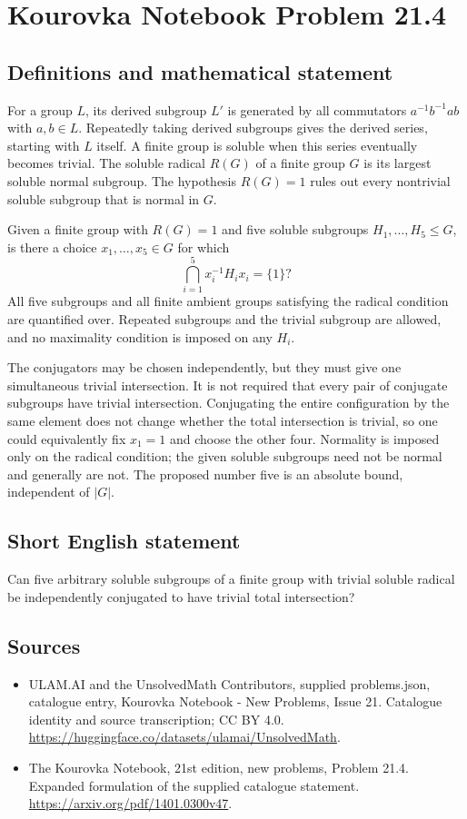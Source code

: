 \documentclass[11pt,a4paper]{article}
\begin{document}
\section*{Kourovka Notebook Problem 21.4}\label{statement}

\subsection{Definitions and mathematical statement}
For a group $L$, its derived subgroup $L'$ is generated by all
commutators $a^{-1}b^{-1}ab$ with $a,b\in L$. Repeatedly taking derived
subgroups gives the derived series, starting with $L$ itself.
A finite group is soluble when this series eventually becomes trivial.
The soluble radical $R(G)$ of a finite group $G$ is its largest soluble
normal subgroup. The hypothesis $R(G)=1$ rules out every nontrivial
soluble subgroup that is normal in $G$.

Given a finite group with $R(G)=1$ and five soluble subgroups
$H_1,\ldots,H_5\le G$, is there a choice $x_1,\ldots,x_5\in G$ for which
\[
 \bigcap_{i=1}^{5}x_i^{-1}H_i x_i=\{1\}?
\]
All five subgroups and all finite ambient groups satisfying the radical
condition are quantified over. Repeated subgroups and the trivial subgroup
are allowed, and no maximality condition is imposed on any $H_i$.

The conjugators may be chosen independently, but they must give one
simultaneous trivial intersection. It is not required that every pair
of conjugate subgroups have trivial intersection. Conjugating the entire
configuration by the same element does not change whether the total
intersection is trivial, so one could equivalently fix $x_1=1$ and
choose the other four. Normality is imposed only on the radical condition;
the given soluble subgroups need not be normal and generally are not.
The proposed number five is an absolute bound, independent of $|G|$.
\subsection{Short English statement}
Can five arbitrary soluble subgroups of a finite group with trivial soluble radical be independently conjugated to have trivial total intersection?
\subsection{Sources}
\begin{itemize}
\item[S1] ULAM.AI and the UnsolvedMath Contributors, supplied problems.json, catalogue entry, Kourovka Notebook - New Problems, Issue 21. Catalogue identity and source transcription; CC BY 4.0.
\url{https://huggingface.co/datasets/ulamai/UnsolvedMath}.
\item[S2] The Kourovka Notebook, 21st edition, new problems, Problem 21.4. Expanded formulation of the supplied catalogue statement.
\url{https://arxiv.org/pdf/1401.0300v47}.
\end{itemize}
\end{document}
